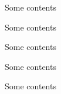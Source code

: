 \documentclass[aspectratio=169, xcolor={x11names}]{beamer}
\begin{document}
\begin{frame}
Some contents
\end{frame}

\begin{frame}





Some contents
\end{frame}

\begin{frame}
Some contents
\end{frame}

\begin{frame}
Some contents
\end{frame}

\begin{frame}
Some contents
\end{frame}
\end{document}
